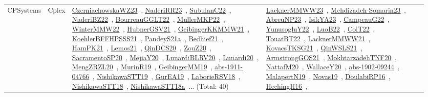 {\begin{longtable}{lp{3cm}>{\raggedright\arraybackslash}p{6cm}>{\raggedright\arraybackslash}p{6cm}>{\raggedright\arraybackslash}p{8cm}}
CPSystems & Cplex & \href{works/CzerniachowskaWZ23.pdf}{CzerniachowskaWZ23}~\cite{CzerniachowskaWZ23}, \href{works/NaderiRR23.pdf}{NaderiRR23}~\cite{NaderiRR23}, \href{works/SubulanC22.pdf}{SubulanC22}~\cite{SubulanC22}, \href{works/NaderiBZ22.pdf}{NaderiBZ22}~\cite{NaderiBZ22}, \href{works/BourreauGGLT22.pdf}{BourreauGGLT22}~\cite{BourreauGGLT22}, \href{works/MullerMKP22.pdf}{MullerMKP22}~\cite{MullerMKP22}, \href{works/WinterMMW22.pdf}{WinterMMW22}~\cite{WinterMMW22}, \href{works/HubnerGSV21.pdf}{HubnerGSV21}~\cite{HubnerGSV21}, \href{works/GeibingerKKMMW21.pdf}{GeibingerKKMMW21}~\cite{GeibingerKKMMW21}, \href{works/KoehlerBFFHPSSS21.pdf}{KoehlerBFFHPSSS21}~\cite{KoehlerBFFHPSSS21}, \href{works/PandeyS21a.pdf}{PandeyS21a}~\cite{PandeyS21a}, \href{works/Bedhief21.pdf}{Bedhief21}~\cite{Bedhief21}, \href{works/HamPK21.pdf}{HamPK21}~\cite{HamPK21}, \href{works/Lemos21.pdf}{Lemos21}~\cite{Lemos21}, \href{works/QinDCS20.pdf}{QinDCS20}~\cite{QinDCS20}, \href{works/ZouZ20.pdf}{ZouZ20}~\cite{ZouZ20}, \href{works/SacramentoSP20.pdf}{SacramentoSP20}~\cite{SacramentoSP20}, \href{works/MejiaY20.pdf}{MejiaY20}~\cite{MejiaY20}, \href{works/LunardiBLRV20.pdf}{LunardiBLRV20}~\cite{LunardiBLRV20}, \href{works/Lunardi20.pdf}{Lunardi20}~\cite{Lunardi20}, \href{works/MengZRZL20.pdf}{MengZRZL20}~\cite{MengZRZL20}, \href{works/MurinR19.pdf}{MurinR19}~\cite{MurinR19}, \href{works/GeibingerMM19.pdf}{GeibingerMM19}~\cite{GeibingerMM19}, \href{works/abs-1911-04766.pdf}{abs-1911-04766}~\cite{abs-1911-04766}, \href{works/NishikawaSTT19.pdf}{NishikawaSTT19}~\cite{NishikawaSTT19}, \href{works/GurEA19.pdf}{GurEA19}~\cite{GurEA19}, \href{works/LaborieRSV18.pdf}{LaborieRSV18}~\cite{LaborieRSV18}, \href{works/NishikawaSTT18.pdf}{NishikawaSTT18}~\cite{NishikawaSTT18}, \href{works/NishikawaSTT18a.pdf}{NishikawaSTT18a}~\cite{NishikawaSTT18a}... (Total: 40) & \href{works/LacknerMMWW23.pdf}{LacknerMMWW23}~\cite{LacknerMMWW23}, \href{works/Mehdizadeh-Somarin23.pdf}{Mehdizadeh-Somarin23}~\cite{Mehdizadeh-Somarin23}, \href{works/AbreuNP23.pdf}{AbreuNP23}~\cite{AbreuNP23}, \href{works/IsikYA23.pdf}{IsikYA23}~\cite{IsikYA23}, \href{works/CampeauG22.pdf}{CampeauG22}~\cite{CampeauG22}, \href{works/YunusogluY22.pdf}{YunusogluY22}~\cite{YunusogluY22}, \href{works/LuoB22.pdf}{LuoB22}~\cite{LuoB22}, \href{works/ColT22.pdf}{ColT22}~\cite{ColT22}, \href{works/TouatBT22.pdf}{TouatBT22}~\cite{TouatBT22}, \href{works/LacknerMMWW21.pdf}{LacknerMMWW21}~\cite{LacknerMMWW21}, \href{works/KovacsTKSG21.pdf}{KovacsTKSG21}~\cite{KovacsTKSG21}, \href{works/QinWSLS21.pdf}{QinWSLS21}~\cite{QinWSLS21}, \href{works/ArmstrongGOS21.pdf}{ArmstrongGOS21}~\cite{ArmstrongGOS21}, \href{works/MokhtarzadehTNF20.pdf}{MokhtarzadehTNF20}~\cite{MokhtarzadehTNF20}, \href{works/NattafM20.pdf}{NattafM20}~\cite{NattafM20}, \href{works/WallaceY20.pdf}{WallaceY20}~\cite{WallaceY20}, \href{works/abs-1902-09244.pdf}{abs-1902-09244}~\cite{abs-1902-09244}, \href{works/MalapertN19.pdf}{MalapertN19}~\cite{MalapertN19}, \href{works/Novas19.pdf}{Novas19}~\cite{Novas19}, \href{works/DoulabiRP16.pdf}{DoulabiRP16}~\cite{DoulabiRP16}, \href{works/HechingH16.pdf}{HechingH16}~\cite{HechingH16}, 
\end{longtable}}
